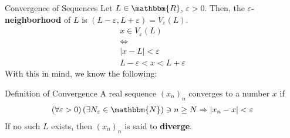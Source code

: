 \documentclass[10pt]{extarticle}
\newcommand{\N}{\mathbbm{N}}
\newcommand{\R}{\mathbbm{R}}
\begin{document}
  \begin{problem}{Convergence of Sequences}
    Let $L\in\R$, $\varepsilon > 0$. Then, the $\varepsilon$\textbf{-neighborhood} of $L$ is $(L-\varepsilon, L+\varepsilon) = V_{\varepsilon}(L)$.
    \begin{align*}
      x\in V_{\varepsilon}(L)\\
      \Leftrightarrow\\
      |x-L| < \varepsilon\\
      L-\varepsilon < x < L+\varepsilon
    \end{align*}
    With this in mind, we know the following:
    \begin{problem}{Definition of Convergence}
      A real sequence $(x_n)_n$ converges to a number $x$ if 
      \begin{align*}
        \left(\forall \varepsilon > 0\right)\left(\exists N_{\varepsilon}\in\N\right) \ni n\geq N \Rightarrow |x_n-x| < \varepsilon
      \end{align*}
      If no such $L$ exists, then $(x_n)_n$ is said to \textbf{diverge}.\\


\end{problem}
\end{problem}
\end{document}
